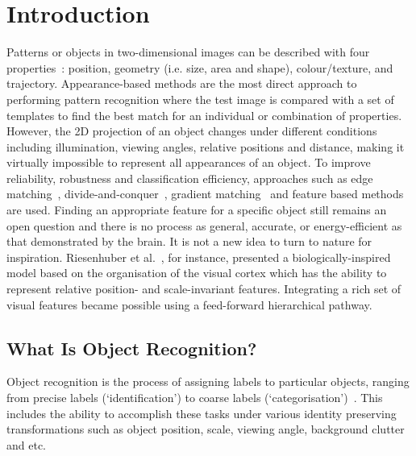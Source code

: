 \documentclass[journal]{journal}
\begin{document}
\section{Introduction}
Patterns or objects in two-dimensional images can be described with four properties~\cite{wysoski2008fast}: position, geometry (i.e. size, area and shape), colour/texture, and trajectory. 
Appearance-based methods are the most direct approach to performing pattern recognition where the test image is compared with a set of templates to find the best match for an individual or combination of properties. 
However, the 2D projection of an object changes under different conditions including illumination, viewing angles, relative positions and distance, making it virtually impossible to represent all appearances of an object. 
To improve reliability, robustness and classification efficiency, approaches such as edge matching~\cite{canny1986computational}, divide-and-conquer~\cite{toygar2004multiple}, gradient matching~\cite{wei2006robust} and feature based methods~\cite{lowe2004distinctive, bay2008speeded} are used.
Finding an appropriate feature for a specific object still remains an open question and there is no process as general, accurate, or energy-efficient as that demonstrated by the brain.
It is not a new idea to turn to nature for inspiration. 
Riesenhuber et al.~\cite{riesenhuber1999hierarchical}, for instance, presented a biologically-inspired model based on the organisation of the visual cortex which has the ability to represent relative position- and scale-invariant features.
Integrating a rich set of visual features became possible using a feed-forward hierarchical pathway. 

\subsection{What Is Object Recognition?}
\label{sec:aim}
Object recognition is the process of assigning labels to particular objects, ranging from precise labels (`identification') to coarse labels (`categorisation')~\cite{dicarlo2012does}.
This includes the ability to accomplish these tasks under various identity preserving transformations such as object position, scale, viewing angle, background clutter and etc.
\end{document}
